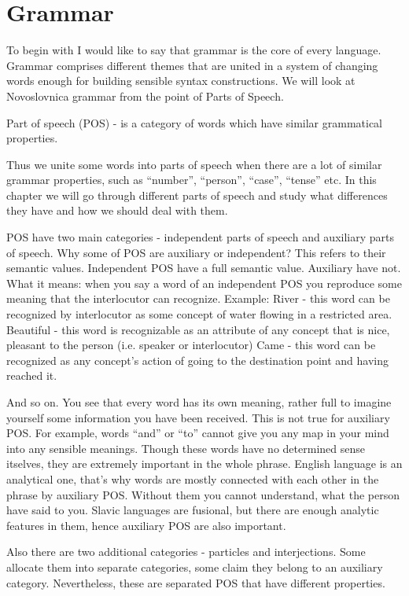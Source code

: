\chapter{Grammar}

To begin with I would like to say that grammar is the core of every language. Grammar comprises different themes that are united in a system of changing words enough for building sensible syntax constructions. We will look at Novoslovnica grammar from the point of Parts of Speech.

Part of speech (POS) - is a category of words which have similar grammatical properties.

Thus we unite some words into parts of speech when there are a lot of similar grammar properties, such as “number”, “person”, “case”, “tense” etc. In this chapter we will go through different parts of speech and study what differences they have and how we should deal with them. 

POS have two main categories - independent parts of speech and auxiliary parts of speech. Why some of POS are auxiliary or independent? This refers to their semantic values. Independent POS have a full semantic value. Auxiliary have not. What it means: when you say a word of an independent POS you reproduce some meaning that the interlocutor can recognize.
Example:
River - this word can be recognized by interlocutor as some concept of water flowing in a restricted area.
Beautiful - this word is recognizable as an attribute of any concept that is nice, pleasant to the person (i.e. speaker or interlocutor)
Came - this word can be recognized as any concept’s action of going to the destination point and having reached it. 

And so on. You see that every word has its own meaning, rather full to imagine yourself some information you have been received. This is not true for auxiliary POS. For example, words “and” or “to” cannot give you any map in your mind into any sensible meanings. Though these words have no determined sense itselves, they are extremely important in the whole phrase. English language is an analytical one, that’s why words are mostly connected with each other in the phrase by auxiliary POS. Without them you cannot understand, what the person have said to you. Slavic languages are fusional, but there are enough analytic features in them, hence auxiliary POS are also important.

Also there are two additional categories - particles and interjections. Some allocate them into separate categories, some claim they belong to an auxiliary category. Nevertheless, these are separated POS that have different properties.

